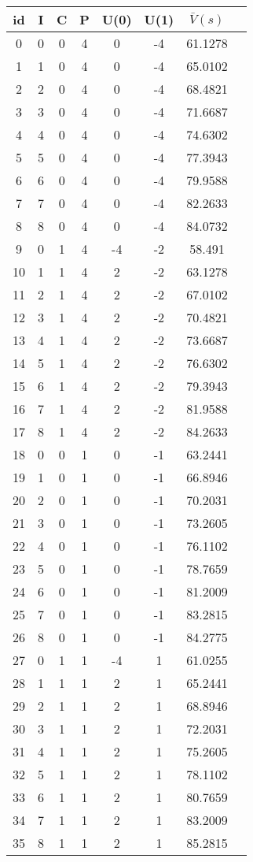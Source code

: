 \documentclass[12pt,english]{article}
\begin{document}
\begin{table}[]
\centering
\caption{}
\begin{tabular}{|c|c|c|c|c|c|c|c|}
\hline
id & I & C & P & U(0) & U(1) & $\bar{V}(s)$      \\
\hline
0  & 0 & 0 & 4 & 0  & -4 & 61.1278 \\
1  & 1 & 0 & 4 & 0  & -4 & 65.0102 \\
2  & 2 & 0 & 4 & 0  & -4 & 68.4821 \\
3  & 3 & 0 & 4 & 0  & -4 & 71.6687 \\
4  & 4 & 0 & 4 & 0  & -4 & 74.6302 \\
5  & 5 & 0 & 4 & 0  & -4 & 77.3943 \\
6  & 6 & 0 & 4 & 0  & -4 & 79.9588 \\
7  & 7 & 0 & 4 & 0  & -4 & 82.2633 \\
8  & 8 & 0 & 4 & 0  & -4 & 84.0732 \\
9  & 0 & 1 & 4 & -4 & -2 & 58.491  \\
10 & 1 & 1 & 4 & 2  & -2 & 63.1278 \\
11 & 2 & 1 & 4 & 2  & -2 & 67.0102 \\
12 & 3 & 1 & 4 & 2  & -2 & 70.4821 \\
13 & 4 & 1 & 4 & 2  & -2 & 73.6687 \\
14 & 5 & 1 & 4 & 2  & -2 & 76.6302 \\
15 & 6 & 1 & 4 & 2  & -2 & 79.3943 \\
16 & 7 & 1 & 4 & 2  & -2 & 81.9588 \\
17 & 8 & 1 & 4 & 2  & -2 & 84.2633 \\
18 & 0 & 0 & 1 & 0  & -1 & 63.2441 \\
19 & 1 & 0 & 1 & 0  & -1 & 66.8946 \\
20 & 2 & 0 & 1 & 0  & -1 & 70.2031 \\
21 & 3 & 0 & 1 & 0  & -1 & 73.2605 \\
22 & 4 & 0 & 1 & 0  & -1 & 76.1102 \\
23 & 5 & 0 & 1 & 0  & -1 & 78.7659 \\
24 & 6 & 0 & 1 & 0  & -1 & 81.2009 \\
25 & 7 & 0 & 1 & 0  & -1 & 83.2815 \\
26 & 8 & 0 & 1 & 0  & -1 & 84.2775 \\
27 & 0 & 1 & 1 & -4 & 1  & 61.0255 \\
28 & 1 & 1 & 1 & 2  & 1  & 65.2441 \\
29 & 2 & 1 & 1 & 2  & 1  & 68.8946 \\
30 & 3 & 1 & 1 & 2  & 1  & 72.2031 \\
31 & 4 & 1 & 1 & 2  & 1  & 75.2605 \\
32 & 5 & 1 & 1 & 2  & 1  & 78.1102 \\
33 & 6 & 1 & 1 & 2  & 1  & 80.7659 \\
34 & 7 & 1 & 1 & 2  & 1  & 83.2009 \\
35 & 8 & 1 & 1 & 2  & 1  & 85.2815\\
\hline
\end{tabular}
\label{Table1}
\end{table}
\end{document}
